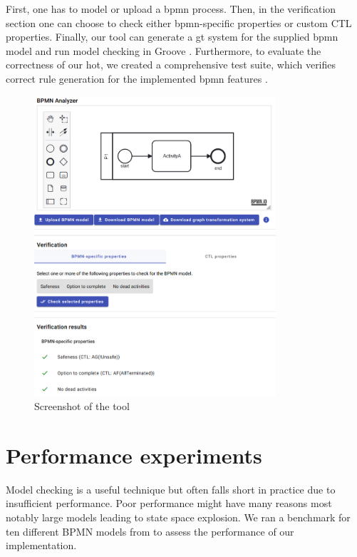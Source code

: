 \documentclass[runningheads]{llncs}
\begin{document}
First, one has to model or upload a \gls*{bpmn} process.
Then, in the verification section one can choose to check either \gls*{bpmn}-specific properties or custom CTL properties.
Finally, our tool can generate a \gls*{gt} system for the supplied \gls*{bpmn} model and run model checking in Groove \cite{kastenbergModelCheckingDynamic2006}.
Furthermore, to evaluate the correctness of our \gls*{hot}, we created a comprehensive test suite, which verifies correct rule generation for the implemented \gls*{bpmn} features \cite{krauterArtifactsICGT2023}.

\begin{figure}[ht]
    \centering
    \includegraphics[width=0.8\textwidth]{images/impl.png}
    \caption{Screenshot of the tool}
    \label{fig:implScreenshot}
\end{figure}

\section{Performance experiments}

Model checking is a useful technique but often falls short in practice due to insufficient performance.
Poor performance might have many reasons most notably large models leading to state space explosion.
We ran a benchmark for ten different BPMN models from \cite{houhouFirstOrderLogicVerification2022} to assess the performance of our implementation. %
\end{document}
